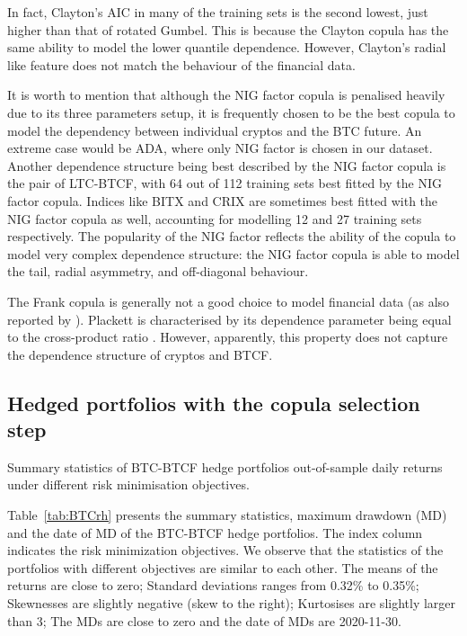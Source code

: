 In fact, Clayton's AIC in many of the training sets is the second lowest, just higher than that of rotated Gumbel.
This is because the Clayton copula has the same ability to model the lower quantile dependence.
However, Clayton's radial like feature does not match the behaviour of
the financial data. \medskip

It is worth to mention that although the NIG factor copula is penalised heavily due to its three parameters setup,
it is frequently chosen to be the best copula to model the dependency
between individual cryptos and the BTC future.
An extreme case would be ADA, where only NIG factor is chosen in our dataset.
Another dependence structure being best described by the NIG factor
copula is the pair of LTC-BTCF, with
64 out of 112 training sets best fitted by the NIG factor copula.
Indices like BITX and CRIX are sometimes best fitted with the NIG
factor copula as well, accounting for modelling 12 and 27 training
sets respectively.
The popularity of the NIG factor reflects the ability of the copula to
model very complex dependence structure: the
NIG factor copula is able to model the tail, radial asymmetry, and
off-diagonal behaviour.  \medskip

The Frank copula is generally not a good choice to model financial
data (as also reported by \cite{barbi2014copula}).
Plackett is characterised by its dependence parameter being equal to
the cross-product ratio %
. 
However, apparently, this property does not capture the dependence
structure of cryptos and BTCF.


\subsection{Hedged portfolios with the copula selection step}\label{subsec:HP2}
\begin{table}[t] \centering
    
    \caption{Summary statistics of BTC-BTCF hedge portfolios out-of-sample daily returns under different risk minimisation objectives.}
\label{tab:BTCrh}
\end{table}
Table~\ref{tab:BTCrh} presents the summary statistics, maximum drawdown (MD) and the date of MD of the BTC-BTCF hedge portfolios.
The index column indicates the risk minimization objectives.
We observe that the statistics of the portfolios with different objectives are similar to each other.
The means of the returns are close to zero;
Standard deviations ranges from 0.32\% to 0.35\%;
Skewnesses are slightly negative (skew to the right);
Kurtosises are slightly larger than 3;
The MDs are close to zero and the date of MDs are 2020-11-30.

